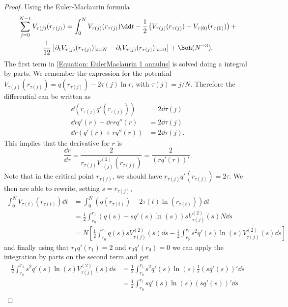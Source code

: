 \begin{proof}
	Using the Euler-Maclaurin formula
	\begin{multline}
		\sum_{j=0}^{N-1} V_{\tau(j)}(r_{\tau(j)}) = \int_0^N V_{\tau(j)}(r_{\tau(j)})  \dd t - \frac{1}{2} \left( V_{\tau(j)}(r_{\tau(j)})  - V_{\tau(0)}(r_{\tau(0)}) \right) + \\ \frac{1}{12} \left[ \partial_t V_{\tau(j)}(r_{\tau(j)}) |_{t=N} - \partial_t V_{\tau(j)}(r_{\tau(j)}) |_{t=0} \right] + \Boh(N^{-3}).
		\label{Equation: EulerMaclaurin 1 annulus}
	\end{multline}
	The first term in \eqref{Equation: EulerMaclaurin 1 annulus} is solved doing a integral by parts. We remember the expression for the potential $V_{\tau(j)}(r_{\tau(j)}) = q(r_{\tau(j)}) - 2 \tau(j) \ln r$, with $\tau(j) = j/N$. Therefore the differential can be written as
	\begin{align}
		\dd( r_{\tau(j)} q'(r_{\tau(j)}) ) & = 2 \dd \tau(j) \\
		\dd r q'(r) + \dd r r q''(r) & = 2 \dd \tau(j) \\
		\dd r (q'(r) + r q''(r)) & = 2 \dd \tau(j).
	\end{align}
	This implies that the derivative for $r$ is
	\begin{equation}
		\frac{\dd r}{\dd \tau} = \frac{2}{r_{\tau(j)} V^{(2)}_{\tau(j)}(r_{\tau(j)})} = \frac{2}{(r q'(r))'}.
	\end{equation}
	Note that in the critical point $r_{\tau(j)}$, we should have $r_{\tau(j)} q'(r_{\tau(j)}) = 2 \tau$. We then are able to rewrite, setting $s = r_{\tau(j)}$,
	\begin{align}
		\int_0^N V_{\tau(t)}(r_{\tau(t)})  \dd t & = \int_0^N (q(r_{\tau(t)}) - 2 \tau(t) \ln(r_{\tau(t)})) \dd t \\
		& = \frac{1}{2} \int_{r_0}^{r_1} (q(s) - s q'(s) \ln(s)) s V^{(2)}_{\tau(j)}(s) N \dd s \\
		& = N \left[  \frac{1}{2} \int_{r_0}^{r_1} q(s) s V^{(2)}_{\tau(j)}(s) \dd s -  \frac{1}{2} \int_{r_0}^{r_1} s^2 q'(s) \ln(s) V^{(2)}_{\tau(j)}(s) \dd s \right]
	\end{align}
	and finally using that $r_1 q'(r_1) = 2$ and $r_0 q'(r_0) = 0$ we can apply the integration by parts on the second term and get
	\begin{align}
		\frac{1}{2} \int_{r_0}^{r_1} s^2 q'(s) \ln(s) V^{(2)}_{\tau(j)}(s) \dd s & = \frac{1}{2} \int_{r_0}^{r_1} s^2 q'(s) \ln(s) \frac{1}{s} (s q'(s))' \dd s \\
		&= \frac{1}{2} \int_{r_0}^{r_1} s q'(s) \ln(s) (s q'(s))' \dd s \\

\end{align}
\end{proof}
